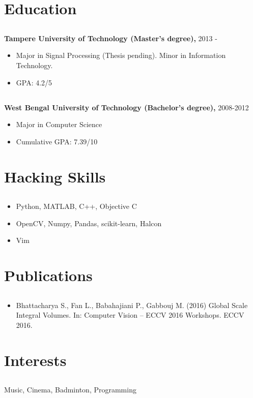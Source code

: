 \documentclass{article}
\begin{document}
\section{Education}
\subsection{}
\textbf{Tampere University of Technology (Master's degree),} 2013 - 
\begin{itemize}[label={--}]
  \itemsep0em 
  \item Major in Signal Processing (Thesis pending). Minor in Information
    Technology.
  \item GPA: 4.2/5
\end{itemize}

\subsection{}
\textbf{West Bengal University of Technology (Bachelor's degree),} 2008-2012
\begin{itemize}[label={--}]
  \itemsep0em 
  \item Major in Computer Science
  \item Cumulative GPA: 7.39/10
\end{itemize}

\section{Hacking Skills}
\subsection{}
\begin{itemize}[label={--}]
  \itemsep0em 
  \item Python, MATLAB, C++, Objective C
  \item OpenCV, Numpy, Pandas, scikit-learn, Halcon
  \item Vim
\end{itemize}

\section{Publications}
\subsection{}
\begin{itemize}[label={--}]
  \itemsep0em 
  \item Bhattacharya S., Fan L., Babahajiani P., Gabbouj M. (2016) Global Scale
    Integral Volumes. In: Computer Vision – ECCV 2016 Workshops. ECCV 2016.
\end{itemize}

\section{Interests}
\subsection{}
Music, Cinema, Badminton, Programming
\end{document}
